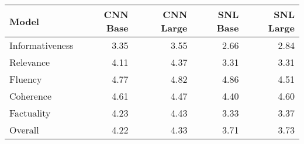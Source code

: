 \begin{tabular}{lrrrr}
\toprule
Model & CNN Base & CNN Large & SNL Base & SNL Large \\
\midrule
Informativeness & 3.35 & 3.55 & 2.66 & 2.84 \\
Relevance & 4.11 & 4.37 & 3.31 & 3.31 \\
Fluency & 4.77 & 4.82 & 4.86 & 4.51 \\
Coherence & 4.61 & 4.47 & 4.40 & 4.60 \\
Factuality & 4.23 & 4.43 & 3.33 & 3.37 \\
Overall & 4.22 & 4.33 & 3.71 & 3.73 \\
\bottomrule
\end{tabular}
